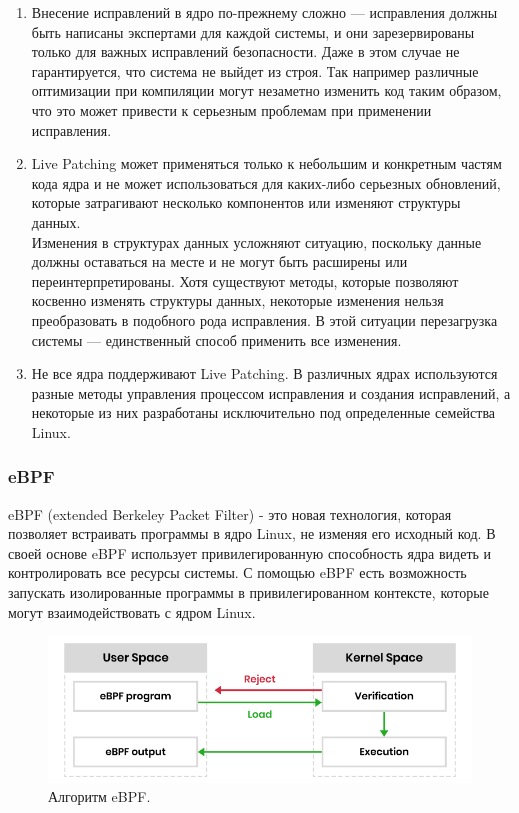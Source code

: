 \begin{enumerate}
    \item Внесение исправлений в ядро по-прежнему сложно — исправления должны быть написаны экспертами для каждой системы,
    и они зарезервированы только для важных исправлений безопасности.
    Даже в этом случае не гарантируется, что система не выйдет из строя.
    Так например различные оптимизации при компиляции могут незаметно изменить код таким образом, что это может привести к серьезным проблемам при применении исправления.\cite{livepatch-problems}
    \item Live Patching может применяться только к небольшим и конкретным частям кода ядра и не может использоваться для каких-либо серьезных обновлений,
    которые затрагивают несколько компонентов или изменяют структуры данных.
    \vspace{0.5cm}\\
    Изменения в структурах данных усложняют ситуацию, поскольку данные должны оставаться на месте и не могут быть расширены или переинтерпретированы.
    Хотя существуют методы, которые позволяют косвенно изменять структуры данных, некоторые изменения нельзя преобразовать в подобного рода исправления.
    В этой ситуации перезагрузка системы — единственный способ применить все изменения.
    \item Не все ядра поддерживают Live Patching.
    В различных ядрах используются разные методы управления процессом исправления и создания исправлений,
    а некоторые из них разработаны исключительно под определенные семейства Linux.\cite{infosec}
\end{enumerate}

\subsubsection{eBPF}\label{subsec:ebpf}

eBPF (extended Berkeley Packet Filter) - это новая технология, которая позволяет встраивать программы в ядро Linux, не изменяя его исходный код.
В своей основе eBPF использует привилегированную способность ядра видеть и контролировать все ресурсы системы.
С помощью eBPF есть возможность запускать изолированные программы в привилегированном контексте, которые могут взаимодействовать с ядром Linux.

\begin{figure}[h]
    \centering
    \includegraphics[width=\textwidth]{inc/img/eBPF_work}
    \caption{Алгоритм eBPF.}
    \label{fig:eBPF_work}
\end{figure}

